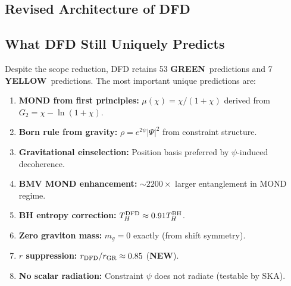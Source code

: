 \documentclass[11pt,a4paper]{article}
\newcommand{\GREEN}{\textcolor{dfdgreen}{\textbf{GREEN}}}
\newcommand{\YELLOW}{\textcolor{dfdyellow}{\textbf{YELLOW}}}
\newcommand{\NEW}{\textcolor{dfdblue}{\textbf{NEW}}}
\begin{document}
\subsection{Revised Architecture of DFD}

\begin{center}
\end{center}

\subsection{What DFD Still Uniquely Predicts}

Despite the scope reduction, DFD retains 53 \GREEN\ predictions and 7 \YELLOW\ predictions. The most important unique predictions are:

\begin{enumerate}
\item \textbf{MOND from first principles:} $\mu(\chi) = \chi/(1+\chi)$ derived from $G_2 = \chi - \ln(1+\chi)$.
\item \textbf{Born rule from gravity:} $\rho = e^{2\psi}|\Psi|^2$ from constraint structure.
\item \textbf{Gravitational einselection:} Position basis preferred by $\psi$-induced decoherence.
\item \textbf{BMV MOND enhancement:} $\sim 2200\times$ larger entanglement in MOND regime.
\item \textbf{BH entropy correction:} $T_H^{\rm DFD} \approx 0.91 T_H^{\rm BH}$.
\item \textbf{Zero graviton mass:} $m_g = 0$ exactly (from shift symmetry).
\item \textbf{$r$ suppression:} $r_{\rm DFD}/r_{\rm GR} \approx 0.85$ (\NEW).
\item \textbf{No scalar radiation:} Constraint $\psi$ does not radiate (testable by SKA).
\end{enumerate}
\end{document}

